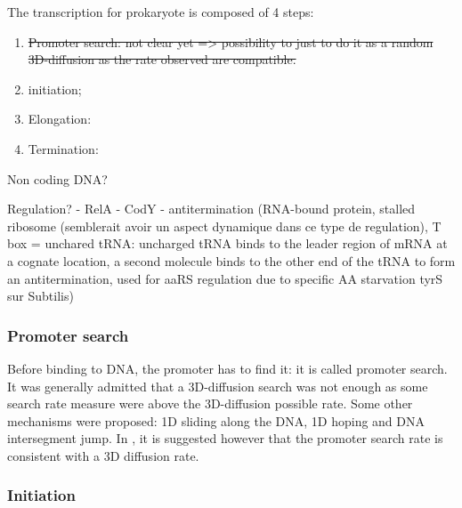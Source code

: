 The transcription for prokaryote is composed of 4 steps:
\begin{enumerate}
  \item \sout{Promoter search: not clear yet => possibility to just to do it as a random 3D-diffusion as the rate observed are compatible.}
  \item initiation;
  \item Elongation:
  \item Termination:
\end{enumerate}

\textcolor[rgb]{1.00,0.00,0.00}{Non coding DNA?}

\bigskip

\textcolor[rgb]{1.00,0.00,0.00}{\Huge Regulation?}
- RelA
- CodY
- antitermination (RNA-bound protein, stalled ribosome (semblerait avoir un aspect dynamique dans ce type de regulation), T box = unchared tRNA: uncharged tRNA binds to the leader region of mRNA at a cognate location, a second molecule binds to the other end of the tRNA to form an antitermination, used for aaRS regulation due to specific AA starvation tyrS sur Subtilis)


\subsubsection{Promoter search} Before binding to DNA, the promoter has to find it: it is called promoter search. It was generally admitted that a 3D-diffusion search was not enough as some search rate measure were above the 3D-diffusion possible rate. Some other mechanisms were proposed: 1D sliding along the DNA, 1D hoping and DNA intersegment jump. In \cite{Hal:09}, it is suggested however that the promoter search rate is consistent with a 3D diffusion rate.



\subsubsection{Initiation}
